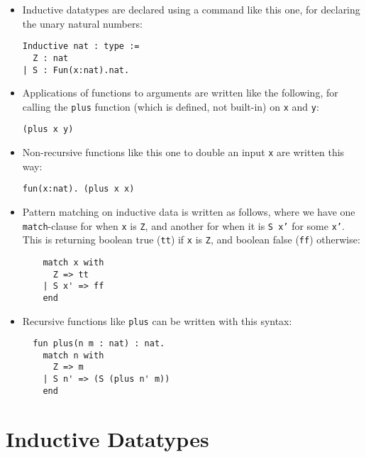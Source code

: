 \documentclass{book}[12pt]
\begin{document}
\begin{itemize}

\item Inductive datatypes are declared using a command like this
one, for declaring the unary natural numbers:

\begin{verbatim}
Inductive nat : type :=
  Z : nat
| S : Fun(x:nat).nat.
\end{verbatim}

\item Applications of functions to arguments are written like the
following, for calling the \texttt{plus} function (which is defined,
not built-in) on \texttt{x} and \texttt{y}:

\begin{verbatim}
(plus x y)
\end{verbatim}

\item Non-recursive functions like this one to double an input
\texttt{x} are written this way:

\begin{verbatim}
fun(x:nat). (plus x x)
\end{verbatim}

\item Pattern matching on inductive data is written as follows, where
we have one \texttt{match}-clause for when \texttt{x} is \texttt{Z},
and another for when it is \texttt{S x'} for some \texttt{x'}.  This
is returning boolean true (\texttt{tt}) if \texttt{x} is \texttt{Z},
and boolean false (\texttt{ff}) otherwise:

\begin{verbatim}
    match x with 
      Z => tt 
    | S x' => ff
    end
\end{verbatim}

\item Recursive functions like \texttt{plus} can be written with this
syntax:

\begin{verbatim}
  fun plus(n m : nat) : nat.
    match n with
      Z => m
    | S n' => (S (plus n' m))
    end
\end{verbatim}

\end{itemize}


\section{Inductive Datatypes}
\label{ch2:ind}
\end{document}

